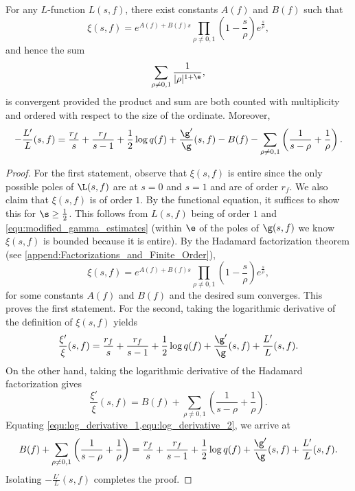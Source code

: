     \begin{proposition}\label{prop:explicit_formula_log_derivative}
      For any $L$-function $L(s,f)$, there exist constants $A(f)$ and $B(f)$ such that
      \[
        \xi(s,f) = e^{A(f)+B(f)s}\prod_{\rho \neq 0,1}\left(1-\frac{s}{\rho}\right)e^{\frac{s}{\rho}},
      \]
      and hence the sum
      \[
        \sum_{\rho \neq 0,1}\frac{1}{|\rho|^{1+\e}},
      \]
      is convergent provided the product and sum are both counted with multiplicity and ordered with respect to the size of the ordinate. Moreover,
      \[
        -\frac{L'}{L}(s,f) = \frac{r_{f}}{s}+\frac{r_{f}}{s-1}+\frac{1}{2}\log{q(f)}+\frac{\g'}{\g}(s,f)-B(f)-\sum_{\rho \neq 0,1}\left(\frac{1}{s-\rho}+\frac{1}{\rho}\right).
      \] 
    \end{proposition}
    \begin{proof}
      For the first statement, observe that $\xi(s,f)$ is entire since the only possible poles of $\L(s,f)$ are at $s = 0$ and $s = 1$ and are of order $r_{f}$. We also claim that $\xi(s,f)$ is of order $1$. By the functional equation, it suffices to show this for $\s \ge \frac{1}{2}$. This follows from $L(s,f)$ being of order $1$ and \cref{equ:modified_gamma_estimates} (within $\e$ of the poles of $\g(s,f)$ we know $\xi(s,f)$ is bounded because it is entire). By the Hadamard factorization theorem (see \cref{append:Factorizations_and_Finite_Order}),
       \[
        \xi(s,f) = e^{A(f)+B(f)s}\prod_{\rho \neq 0,1}\left(1-\frac{s}{\rho}\right)e^{\frac{s}{\rho}},
      \]
      for some constants $A(f)$ and $B(f)$ and the desired sum converges. This proves the first statement. For the second, taking the logarithmic derivative of the definition of $\xi(s,f)$ yields
      \begin{equation}\label{equ:log_derivative_1}
        \frac{\xi'}{\xi}(s,f) = \frac{r_{f}}{s}+\frac{r_{f}}{s-1}+\frac{1}{2}\log{q(f)}+\frac{\g'}{\g}(s,f)+\frac{L'}{L}(s,f).
      \end{equation}
      On the other hand, taking the logarithmic derivative of the Hadamard factorization gives
      \begin{equation}\label{equ:log_derivative_2}
        \frac{\xi'}{\xi}(s,f) = B(f)+\sum_{\rho \neq 0,1}\left(\frac{1}{s-\rho}+\frac{1}{\rho}\right).
      \end{equation}
      Equating \cref{equ:log_derivative_1,equ:log_derivative_2}, we arrive at
      \[
        B(f)+\sum_{\rho \neq 0,1}\left(\frac{1}{s-\rho}+\frac{1}{\rho}\right) = \frac{r_{f}}{s}+\frac{r_{f}}{s-1}+\frac{1}{2}\log{q(f)}+\frac{\g'}{\g}(s,f)+\frac{L'}{L}(s,f).
      \]
      Isolating $-\frac{L'}{L}(s,f)$ completes the proof.
    \end{proof}

